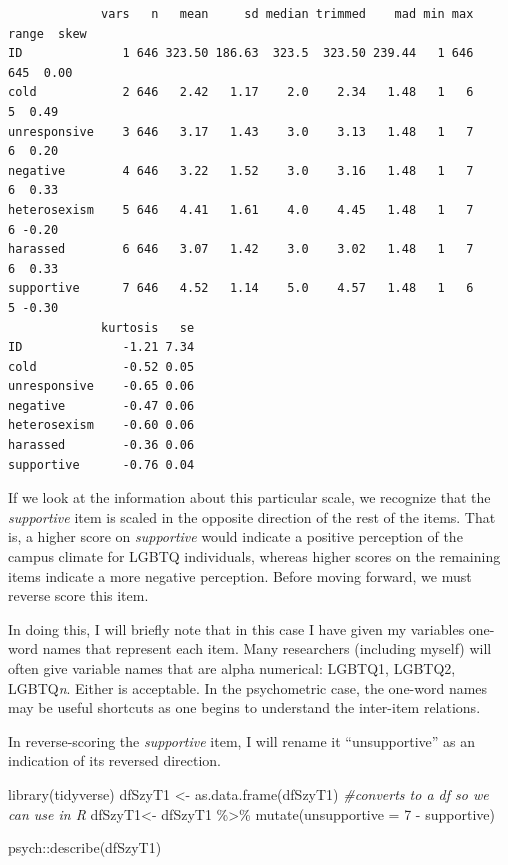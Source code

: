 \documentclass[
  english,
]{book}
\newenvironment{Shaded}{\begin{snugshade}}{\end{snugshade}}
\newcommand{\AttributeTok}[1]{\textcolor[rgb]{0.77,0.63,0.00}{#1}}
\newcommand{\CommentTok}[1]{\textcolor[rgb]{0.56,0.35,0.01}{\textit{#1}}}
\newcommand{\DecValTok}[1]{\textcolor[rgb]{0.00,0.00,0.81}{#1}}
\newcommand{\FunctionTok}[1]{\textcolor[rgb]{0.00,0.00,0.00}{#1}}
\newcommand{\NormalTok}[1]{#1}
\newcommand{\OtherTok}[1]{\textcolor[rgb]{0.56,0.35,0.01}{#1}}
\newcommand{\SpecialCharTok}[1]{\textcolor[rgb]{0.00,0.00,0.00}{#1}}
\begin{document}
\begin{verbatim}
             vars   n   mean     sd median trimmed    mad min max range  skew
ID              1 646 323.50 186.63  323.5  323.50 239.44   1 646   645  0.00
cold            2 646   2.42   1.17    2.0    2.34   1.48   1   6     5  0.49
unresponsive    3 646   3.17   1.43    3.0    3.13   1.48   1   7     6  0.20
negative        4 646   3.22   1.52    3.0    3.16   1.48   1   7     6  0.33
heterosexism    5 646   4.41   1.61    4.0    4.45   1.48   1   7     6 -0.20
harassed        6 646   3.07   1.42    3.0    3.02   1.48   1   7     6  0.33
supportive      7 646   4.52   1.14    5.0    4.57   1.48   1   6     5 -0.30
             kurtosis   se
ID              -1.21 7.34
cold            -0.52 0.05
unresponsive    -0.65 0.06
negative        -0.47 0.06
heterosexism    -0.60 0.06
harassed        -0.36 0.06
supportive      -0.76 0.04
\end{verbatim}

If we look at the information about this particular scale, we recognize that the \emph{supportive} item is scaled in the opposite direction of the rest of the items. That is, a higher score on \emph{supportive} would indicate a positive perception of the campus climate for LGBTQ individuals, whereas higher scores on the remaining items indicate a more negative perception. Before moving forward, we must reverse score this item.

In doing this, I will briefly note that in this case I have given my variables one-word names that represent each item. Many researchers (including myself) will often give variable names that are alpha numerical: LGBTQ1, LGBTQ2, LGBTQ\emph{n}. Either is acceptable. In the psychometric case, the one-word names may be useful shortcuts as one begins to understand the inter-item relations.

In reverse-scoring the \emph{supportive} item, I will rename it ``unsupportive'' as an indication of its reversed direction.

\begin{Shaded}
\begin{Highlighting}[]
\FunctionTok{library}\NormalTok{(tidyverse)}
\NormalTok{dfSzyT1 }\OtherTok{\textless{}{-}} \FunctionTok{as.data.frame}\NormalTok{(dfSzyT1) }\CommentTok{\#converts to a df so we can use in R}
\NormalTok{dfSzyT1}\OtherTok{\textless{}{-}}\NormalTok{ dfSzyT1 }\SpecialCharTok{\%\textgreater{}\%}
  \FunctionTok{mutate}\NormalTok{(}\AttributeTok{unsupportive =} \DecValTok{7} \SpecialCharTok{{-}}\NormalTok{ supportive)}

\NormalTok{psych}\SpecialCharTok{::}\FunctionTok{describe}\NormalTok{(dfSzyT1)}
\end{Highlighting}
\end{Shaded}
\end{document}
